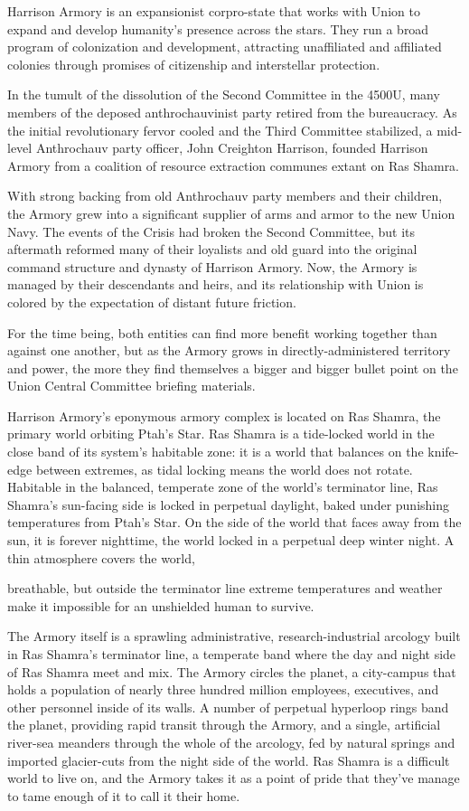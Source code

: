 Harrison Armory is an expansionist corpro-state that works with Union to expand and develop
humanity’s presence across the stars. They run a broad program of colonization and
development, attracting unaffiliated and affiliated colonies through promises of citizenship and
interstellar protection.


In the tumult of the dissolution of the Second Committee in the 4500U, many members of the
deposed anthrochauvinist party retired from the bureaucracy. As the initial revolutionary fervor
cooled and the Third Committee stabilized, a mid-level Anthrochauv party officer, John Creighton
Harrison, founded Harrison Armory from a coalition of resource extraction communes extant on
Ras Shamra.


With strong backing from old Anthrochauv party members and their children, the Armory grew
into a significant supplier of arms and armor to the new Union Navy. The events of the Crisis had
broken the Second Committee, but its aftermath reformed many of their loyalists and old guard
into the original command structure and dynasty of Harrison Armory. Now, the Armory is
managed by their descendants and heirs, and its relationship with Union is colored by the
expectation of distant future friction.


For the time being, both entities can find more benefit working together than against one another,
but as the Armory grows in directly-administered territory and power, the more they find
themselves a bigger and bigger bullet point on the Union Central Committee briefing materials.


Harrison Armory’s eponymous armory complex is located on Ras Shamra, the primary world
orbiting Ptah’s Star. Ras Shamra is a tide-locked world in the close band of its system’s habitable
zone: it is a world that balances on the knife-edge between extremes, as tidal locking means the
world does not rotate. Habitable in the balanced, temperate zone of the world’s terminator line,
Ras Shamra’s sun-facing side is locked in perpetual daylight, baked under punishing
temperatures from Ptah’s Star. On the side of the world that faces away from the sun, it is forever
nighttime, the world locked in a perpetual deep winter night. A thin atmosphere covers the world,




breathable, but outside the terminator line extreme temperatures and weather make it impossible
for an unshielded human to survive.


The Armory itself is a sprawling administrative, research-industrial arcology built in Ras Shamra’s
terminator line, a temperate band where the day and night side of Ras Shamra meet and mix.
The Armory circles the planet, a city-campus that holds a population of nearly three hundred
million employees, executives, and other personnel inside of its walls. A number of perpetual
hyperloop rings band the planet, providing rapid transit through the Armory, and a single, artificial
river-sea meanders through the whole of the arcology, fed by natural springs and imported
glacier-cuts from the night side of the world. Ras Shamra is a difficult world to live on, and the
Armory takes it as a point of pride that they’ve manage to tame enough of it to call it their home.


